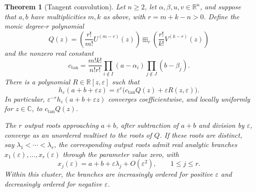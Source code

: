 \documentclass[12pt,reqno]{amsart}
\newtheorem{theorem}{Theorem}[section]
\theoremstyle{definition}
\theoremstyle{remark}
\newcommand{\R}{\mathbb R}
\newcommand{\C}{\mathbb C}
\newcommand{\eps}{\varepsilon}
\begin{document}
\begin{theorem}[Tangent convolution]\label{thm:tangent-convolution}
Let \(n\geq2\), let \(\alpha,\beta,u,v\in\R^n\), and suppose that
\(a,b\) have multiplicities \(m,k\) as above, with
\(r=m+k-n>0\).  Define the monic degree-\(r\) polynomial
\begin{equation}\label{eq:tangent-convolution-polynomial}
 Q(z)=
 \left(\frac{r!}{m!}U^{(m-r)}(z)\right)
 \boxplus_r
 \left(\frac{r!}{k!}V^{(k-r)}(z)\right)
\end{equation}
and the nonzero real constant
\begin{equation}\label{eq:tangent-convolution-constant}
 c_{\mathrm{tan}}=\frac{m!k!}{n!r!}
       \prod_{i\notin I}(a-\alpha_i)
       \prod_{j\notin J}(b-\beta_j).
\end{equation}
There is a polynomial \(R\in\R[z,\eps]\) such that
\begin{equation}\label{eq:tangent-convolution-expansion}
 h_\eps(a+b+\eps z)
   =\eps^r\bigl(c_{\mathrm{tan}}Q(z)+\eps R(z,\eps)\bigr).
\end{equation}
In particular, \(\eps^{-r}h_\eps(a+b+\eps z)\) converges
coefficientwise, and locally uniformly for \(z\in\C\), to \(c_{\mathrm{tan}}Q(z)\).

The \(r\) output roots approaching \(a+b\), after subtraction of
\(a+b\) and division by \(\eps\), converge as an unordered multiset
to the roots of \(Q\).  If these roots are distinct, say
\(\lambda_1<\cdots<\lambda_r\), the corresponding output roots admit
real analytic branches \(x_1(\eps),\ldots,x_r(\eps)\) through the
parameter value zero,
with
\begin{equation}\label{eq:tangent-convolution-branches}
 x_j(\eps)=a+b+\eps\lambda_j+O(\eps^2),
 \qquad 1\leq j\leq r.
\end{equation}
Within this cluster, the branches are increasingly ordered for positive
\(\eps\) and decreasingly ordered for negative \(\eps\).
\end{theorem}
\end{document}
